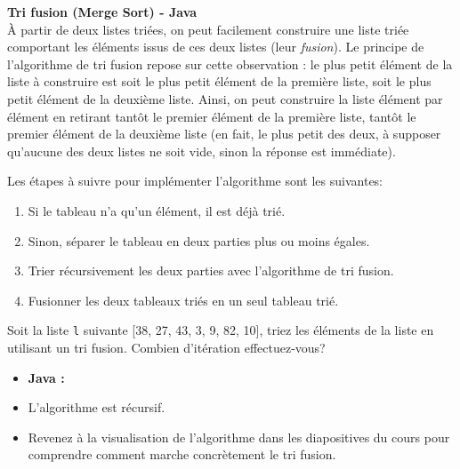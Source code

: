 \begin{Exercice} [20 minutes] \textbf{Tri fusion (Merge Sort) - Java} \\
    À partir de deux listes triées, on peut facilement construire une liste triée comportant les éléments issus de ces deux listes (leur \textit{fusion}). Le principe de l'algorithme de tri fusion repose sur cette observation : le plus petit élément de la liste à construire est soit le plus petit élément de la première liste, soit le plus petit élément de la deuxième liste. Ainsi, on peut construire la liste élément par élément en retirant tantôt le premier élément de la première liste, tantôt le premier élément de la deuxième liste (en fait, le plus petit des deux, à supposer qu'aucune des deux listes ne soit vide, sinon la réponse est immédiate). 
    
    Les étapes à suivre pour implémenter l'algorithme sont les suivantes:
    \begin{enumerate}
        \item Si le tableau n'a qu'un élément, il est déjà trié.
        \item Sinon, séparer le tableau en deux parties plus ou moins égales.
        \item Trier récursivement les deux parties avec l'algorithme de tri fusion.
        \item Fusionner les deux tableaux triés en un seul tableau trié.
    \end{enumerate}
    
    Soit la liste \lstinline{l} suivante [38, 27, 43, 3, 9, 82, 10], triez les éléments de la liste en utilisant un tri fusion. Combien d'itération effectuez-vous?
    
    \begin{itemize}
        \item \textbf{Java :}
            
    \end{itemize}
    
    \begin{conseil}
    \begin{itemize}
        \item L'algorithme est récursif. 
        \item Revenez à la visualisation de l'algorithme dans les diapositives du cours pour comprendre comment marche concrètement le tri fusion. 
    \end{itemize}
    
    \end{conseil}
    

\end{Exercice}
